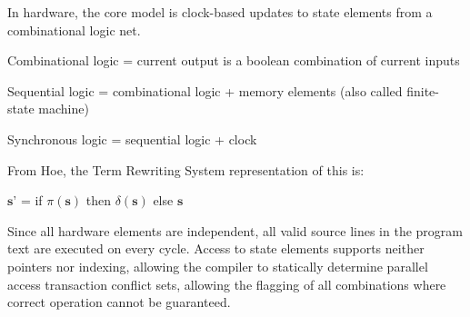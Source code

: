 In hardware, the core model is clock-based updates to state elements from
a combinational logic net.

Combinational logic = current output is a boolean combination of current inputs

Sequential logic = combinational logic + memory elements
(also called finite-state machine)

Synchronous logic = sequential logic + clock


From Hoe\cite{Hoe:Thesis}, the Term Rewriting System representation of this is:

$\textbf{s'}$ = if $\pi(\textbf{s})$ then $\delta(\textbf{s})$ else $\textbf{s}$

Since all hardware elements are independent, all valid source lines in the
program text are executed on every cycle.
Access to state elements supports neither pointers nor indexing, allowing the
compiler to statically determine parallel access transaction conflict sets,
allowing the flagging of all combinations where correct operation cannot
be guaranteed.
